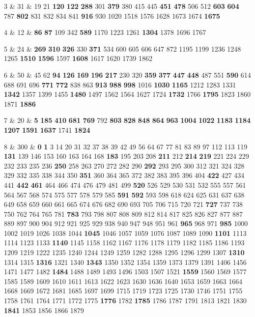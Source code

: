 3 & 31 & 19 21 \textbf{120} \textbf{122} \textbf{288} 301 \textbf{379} 380 415 445 \textbf{451} \textbf{478} 506 512 \textbf{603} \textbf{604} 787 \textbf{802} 831 832 834 841 \textbf{916} 930 1020 1518 1576 1628 1673 1674 \textbf{1675} \\  

4 & 12 & \textbf{86} \textbf{87} 109 342 \textbf{589} 1170 1223 1261 \textbf{1304} 1378 1696 1767 \\  

5 & 24 & \textbf{269} \textbf{310} \textbf{326} 330 \textbf{371} 534 600 605 606 647 872 1195 1199 1236 1248 1265 \textbf{1510} \textbf{1596} 1597 \textbf{1608} 1617 1620 1739 1862 \\  

6 & 50 & 45 62 \textbf{94} \textbf{126} \textbf{169} \textbf{196} \textbf{217} 230 320 \textbf{359} \textbf{377} \textbf{447} \textbf{448} 487 551 \textbf{590} 614 688 691 696 \textbf{771} \textbf{772} 838 863 \textbf{913} \textbf{988} \textbf{998} 1016 \textbf{1030} \textbf{1165} 1212 1283 1331 \textbf{1342} 1357 1399 1455 \textbf{1480} 1497 1562 1564 1627 1724 \textbf{1732} 1766 \textbf{1795} 1823 1860 1871 \textbf{1886} \\  

7 & 20 & \textbf{5} \textbf{185} \textbf{410} \textbf{681} \textbf{769} 792 \textbf{803} \textbf{828} \textbf{848} \textbf{864} \textbf{963} \textbf{1004} \textbf{1022} \textbf{1183} \textbf{1184} \textbf{1207} \textbf{1591} \textbf{1637} 1741 \textbf{1824} \\  

8 & 300 & \textbf{0} \textbf{1} 3 14 20 31 32 37 38 39 42 49 56 64 67 77 81 83 89 97 112 113 119 \textbf{131} 139 146 153 160 163 164 168 \textbf{183} 195 203 208 \textbf{211} 212 \textbf{214} \textbf{219} 221 224 229 232 233 235 236 \textbf{250} 258 263 270 272 282 290 \textbf{292} 293 295 300 312 321 324 328 329 332 335 338 344 350 \textbf{351} 360 364 365 372 382 383 395 396 404 \textbf{422} 427 434 441 \textbf{442} \textbf{461} 464 466 474 476 479 481 499 \textbf{520} 526 529 530 531 532 555 557 561 564 567 568 574 575 577 578 579 585 \textbf{591} \textbf{592} 593 598 618 624 625 631 637 638 649 658 659 660 661 665 674 676 682 690 693 705 706 715 720 721 \textbf{727} 737 738 750 762 764 765 781 \textbf{783} 793 798 807 808 809 812 814 817 825 826 827 877 887 889 897 900 904 912 921 925 929 938 940 947 948 951 961 \textbf{965} 968 971 \textbf{985} 1000 1002 1019 1026 1038 1044 \textbf{1045} 1046 1057 1059 1076 1087 1089 1090 \textbf{1101} 1113 1114 1123 1133 \textbf{1140} 1145 1158 1162 1167 1176 1178 1179 1182 1185 1186 1193 1209 1219 1222 1235 1240 1244 1249 1259 1282 1288 1295 1296 1299 1307 \textbf{1310} 1314 1315 \textbf{1316} 1321 1340 \textbf{1343} 1350 1352 1354 1359 1373 1379 1391 1406 1456 1471 1477 1482 \textbf{1484} 1488 1489 1493 1496 1503 1507 1521 \textbf{1559} 1560 1569 1577 1585 1589 1609 1610 1611 1613 1622 1623 1630 1636 1640 1653 1659 1663 1664 1668 1669 1672 1681 1685 1697 1699 1715 1719 1723 1725 1730 1746 1751 1755 1758 1761 1764 1771 1772 1775 \textbf{1776} 1782 \textbf{1785} 1786 1787 1791 1813 1821 1830 \textbf{1841} 1853 1856 1866 1879 \\  

